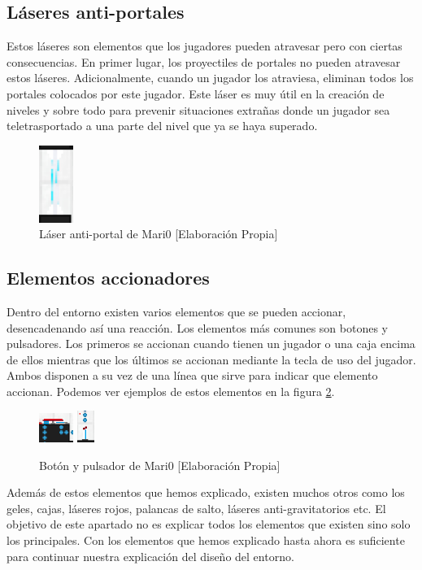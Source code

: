 \subsection*{Láseres anti-portales}

Estos láseres son elementos que los jugadores pueden atravesar pero con ciertas consecuencias. En primer lugar, los proyectiles de portales no pueden atravesar estos láseres. Adicionalmente, cuando un jugador los atraviesa, eliminan todos los portales colocados por este jugador. Este láser es muy útil en la creación de niveles y sobre todo para prevenir situaciones extrañas donde un jugador sea teletrasportado a una parte del nivel que ya se haya superado.

\begin{figure}[h]
    \centering
    \includegraphics[width=0.1\textwidth]{img/laser-antiportal.png}
    \caption{Láser anti-portal de Mari0 [Elaboración Propia]}
    \label{fig:antiportal}
\end{figure}

\subsection*{Elementos accionadores}

Dentro del entorno existen varios elementos que se pueden accionar, desencadenando así una reacción. Los elementos más comunes son botones y pulsadores. Los primeros se accionan cuando tienen un jugador o una caja encima de ellos mientras que los últimos se accionan mediante la tecla de uso del jugador. Ambos disponen a su vez de una línea que sirve para indicar que elemento accionan. Podemos ver ejemplos de estos elementos en la figura \ref {fig:boton}.

\begin{figure}[h]
    \centering
    \includegraphics[width=0.1\textwidth]{img/boton.png}
    \includegraphics[width=0.05\textwidth]{img/pulsador.png}
    \caption{Botón y pulsador de Mari0 [Elaboración Propia]}
    \label{fig:boton}
\end{figure}

Además de estos elementos que hemos explicado, existen muchos otros como los geles, cajas, láseres rojos, palancas de salto, láseres anti-gravitatorios etc. El objetivo de este apartado no es explicar todos los elementos que existen sino solo los principales. Con los elementos que hemos explicado hasta ahora es suficiente para continuar nuestra explicación del diseño del entorno. 

